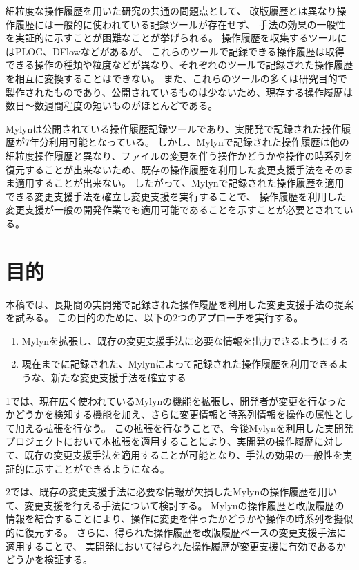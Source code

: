 \documentclass[a4paper]{jsbook}
\begin{document}
細粒度な操作履歴を用いた研究の共通の問題点として、
改版履歴とは異なり操作履歴には一般的に使われている記録ツールが存在せず、
手法の効果の一般性を実証的に示すことが困難なことが挙げられる。
操作履歴を収集するツールにはPLOG\cite{plog}、{\sc DFlow}\cite{minelli:2014}などがあるが、
これらのツールで記録できる操作履歴は取得できる操作の種類や粒度などが異なり、それぞれのツールで記録された操作履歴を相互に変換することはできない。
また、これらのツールの多くは研究目的で製作されたものであり、公開されているものは少ないため、現存する操作履歴は数日〜数週間程度の短いものがほとんどである。

Mylyn\cite{Kersten:2005}は公開されている操作履歴記録ツールであり、実開発で記録された操作履歴が7年分利用可能となっている。
しかし、Mylynで記録された操作履歴は他の細粒度操作履歴と異なり、ファイルの変更を伴う操作かどうかや操作の時系列を復元することが出来ないため、既存の操作履歴を利用した変更支援手法をそのまま適用することが出来ない。
したがって、Mylynで記録された操作履歴を適用できる変更支援手法を確立し変更支援を実行することで、
操作履歴を利用した変更支援が一般の開発作業でも適用可能であることを示すことが必要とされている。
\section{目的}
本稿では、長期間の実開発で記録された操作履歴を利用した変更支援手法の提案を試みる。
この目的のために、以下の2つのアプローチを実行する。
\begin{enumerate}
  \item Mylynを拡張し、既存の変更支援手法に必要な情報を出力できるようにする
  \item 現在までに記録された、Mylynによって記録された操作履歴を利用できるような、新たな変更支援手法を確立する
\end{enumerate}
1では、現在広く使われているMylynの機能を拡張し、開発者が変更を行なったかどうかを検知する機能を加え、さらに変更情報と時系列情報を操作の属性として加える拡張を行なう。
この拡張を行なうことで、今後Mylynを利用した実開発プロジェクトにおいて本拡張を適用することにより、実開発の操作履歴に対して、既存の変更支援手法を適用することが可能となり、手法の効果の一般性を実証的に示すことができるようになる。

2では、既存の変更支援手法に必要な情報が欠損したMylynの操作履歴を用いて、変更支援を行える手法について検討する。
Mylynの操作履歴と改版履歴の情報を結合することにより、操作に変更を伴ったかどうかや操作の時系列を擬似的に復元する。
さらに、得られた操作履歴を改版履歴ベースの変更支援手法に適用することで、
実開発において得られた操作履歴が変更支援に有効であるかどうかを検証する。
\end{document}
